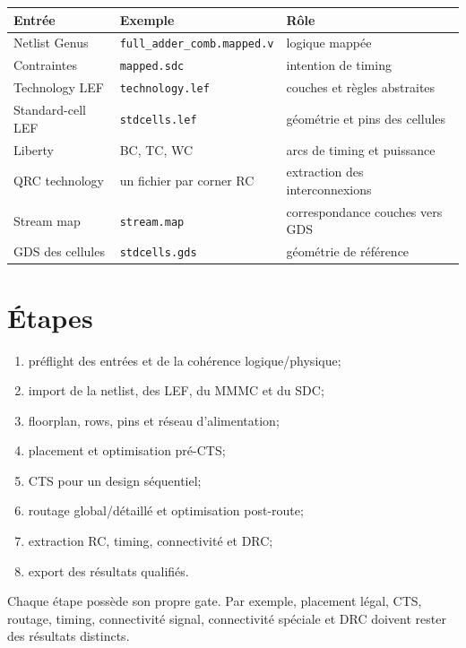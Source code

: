 \documentclass[11pt,a4paper,openany]{report}
\begin{document}
\begin{longtable}{p{}p{}p{}}
\toprule
Entrée & Exemple & Rôle \\
\midrule
Netlist Genus & \texttt{full\_adder\_comb.mapped.v} & logique mappée \\
Contraintes & \texttt{mapped.sdc} & intention de timing \\
Technology LEF & \texttt{technology.lef} & couches et règles abstraites \\
Standard-cell LEF & \texttt{stdcells.lef} & géométrie et pins des cellules \\
Liberty & BC, TC, WC & arcs de timing et puissance \\
QRC technology & un fichier par corner RC & extraction des interconnexions \\
Stream map & \texttt{stream.map} & correspondance couches vers GDS \\
GDS des cellules & \texttt{stdcells.gds} & géométrie de référence \\
\bottomrule
\end{longtable}

\section{Étapes}

\begin{enumerate}
  \item préflight des entrées et de la cohérence logique/physique;
  \item import de la netlist, des LEF, du MMMC et du SDC;
  \item floorplan, rows, pins et réseau d'alimentation;
  \item placement et optimisation pré-CTS;
  \item CTS pour un design séquentiel;
  \item routage global/détaillé et optimisation post-route;
  \item extraction RC, timing, connectivité et DRC;
  \item export des résultats qualifiés.
\end{enumerate}

\begin{keybox}
Chaque étape possède son propre gate. Par exemple, placement légal, CTS,
routage, timing, connectivité signal, connectivité spéciale et DRC doivent
rester des résultats distincts.
\end{keybox}
\end{document}
